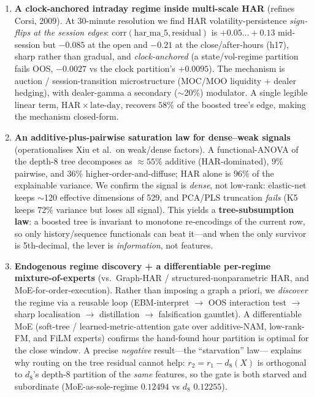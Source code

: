 \begin{enumerate}
\item \textbf{A clock-anchored intraday regime inside multi-scale HAR}
(refines Corsi, 2009). At 30-minute resolution we find HAR volatility-persistence
\emph{sign-flips at the session edges}: $\mathrm{corr}(\mathrm{har\_ma\_5},
\text{residual})$ is $+0.05\!\ldots\!+0.13$ mid-session but $-0.085$ at the open
and $-0.21$ at the close/after-hours (h17), sharp rather than gradual, and
\emph{clock-anchored} (a state/vol-regime partition fails OOS, $-0.0027$ vs the
clock partition's $+0.0095$). The mechanism is auction / session-transition
microstructure (MOC/MOO liquidity + dealer hedging), with dealer-gamma a
secondary ($\sim$20\%) modulator. A single legible linear term,
$\mathrm{HAR}\times\text{late-day}$, recovers $58\%$ of the boosted tree's edge,
making the mechanism closed-form.

\item \textbf{An additive-plus-pairwise saturation law for dense--weak signals}
(operationalises Xiu et al.\ on weak/dense factors). A functional-ANOVA of the
depth-8 tree decomposes as $\approx 55\%$ additive (HAR-dominated), $9\%$
pairwise, and $36\%$ higher-order-and-diffuse; HAR alone is $96\%$ of the
explainable variance. We confirm the signal is \emph{dense}, not low-rank:
elastic-net keeps $\sim$120 effective dimensions of 529, and PCA/PLS truncation
\emph{fails} (K5 keeps $72\%$ variance but loses all signal). This yields a
\textbf{tree-subsumption law}: a boosted tree is invariant to monotone
re-encodings of the current row, so only history/sequence functionals can beat
it---and when the only survivor is 5th-decimal, the lever is \emph{information},
not features.

\item \textbf{Endogenous regime discovery + a differentiable per-regime
mixture-of-experts} (vs.\ Graph-HAR / structured-nonparametric HAR, and
MoE-for-order-execution). Rather than imposing a graph a priori, we \emph{discover}
the regime via a reusable loop (EBM-interpret $\to$ OOS interaction test $\to$
sharp localisation $\to$ distillation $\to$ falsification gauntlet). A
differentiable MoE (soft-tree / learned-metric-attention gate over additive-NAM,
low-rank-FM, and FiLM experts) confirms the hand-found hour partition is optimal
for the close window. A precise \emph{negative} result---the ``starvation'' law---%
explains why routing on the tree residual cannot help: $r_2 = r_1 - d_8(X)$ is
orthogonal to $d_8$'s depth-8 partition of the \emph{same} features, so the gate
is both starved and subordinate (MoE-as-sole-regime $0.12494$ vs $d_8$ $0.12255$).


\end{enumerate}
